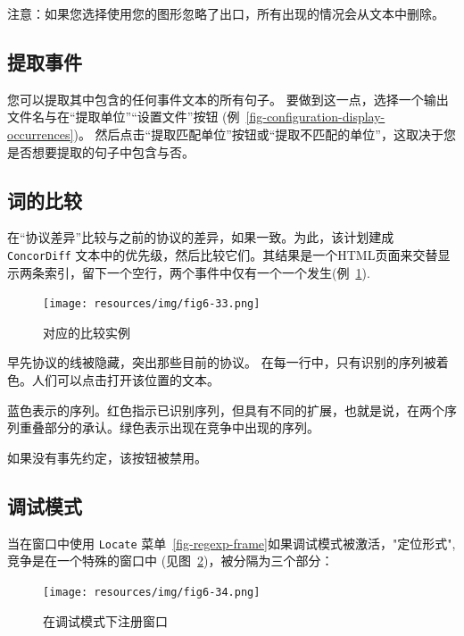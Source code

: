 \bigskip
\noindent 注意：如果您选择使用您的图形忽略了出口，所有出现的情况会从文本中删除。


\subsection{提取事件}
您可以提取其中包含的任何事件文本的所有句子。
要做到这一点，选择一个输出文件名与在“提取单位”“设置文件”按钮 (例~\ref{fig-configuration-display-occurrences})。
然后点击“提取匹配单位”按钮或“提取不匹配的单位”，这取决于您是否想要提取的句子中包含与否。



\subsection{词的比较}
\label{section-comparing-concordances}

在“协议差异”比较与之前的协议的差异，如果一致。为此，该计划建成
\verb+ConcorDiff+ 文本中的优先级，然后比较它们。其结果是一个HTML页面来交替显示两条索引，留下一个空行，两个事件中仅有一个一个发生(例~\ref{fig-concordiff}).

\begin{figure}[h]
\begin{center}
\texttt{[image: resources/img/fig6-33.png]}
\caption{对应的比较实例\label{fig-concordiff}}
\end{center}
\end{figure}

\bigskip
\noindent 
早先协议的线被隐藏，突出那些目前的协议。
在每一行中，只有识别的序列被着色。人们可以点击打开该位置的文本。

\bigskip
\noindent 蓝色表示的序列。红色指示已识别序列，但具有不同的扩展，也就是说，在两个序列重叠部分的承认。绿色表示出现在竞争中出现的序列。

\bigskip
\noindent 如果没有事先约定，该按钮被禁用。

\subsection{调试模式}
\label{section-debug-mode}
当在窗口中使用 \verb+Locate+ 菜单~\ref{fig-regexp-frame}如果调试模式被激活，"定位形式",竞争是在一个特殊的窗口中 (见图~\ref{fig-debug-mode})，被分隔为三个部分：

\begin{figure}[h]
\begin{center}
\texttt{[image: resources/img/fig6-34.png]}
\caption{在调试模式下注册窗口\label{fig-debug-mode}}
\end{center}
\end{figure}

